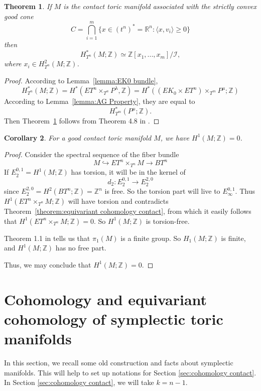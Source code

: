 \documentclass[12pt]{amsart}
\def\Z {{\mathbb{Z}}}
\def\R {{\mathbb{R}}}
\def\I {{\mathcal{I}}}
\newtheorem{theorem}{Theorem}[section]
\newtheorem{corollary}[theorem]{Corollary}
\theoremstyle{definition}
\numberwithin{equation}{section}
\begin{document}
\begin{theorem}\label{theorem:equivariant cohomology contact}
 If $M$ is the contact toric manifold associated with the strictly convex good cone \[C= \bigcap_{i=1}^{m}\{x\in
(t^{n})^{*}=\R^n: \langle x, v_{i}\rangle \geq 0\}\] then
\[H_{T^n}^{*}(M;\Z)\simeq \Z[x_{1},...,x_{m}]/\I,\]
where $x_{i}\in H^{2}_{T^n}(M;\Z)$.
\end{theorem}
\begin{proof} According to Lemma~\ref{lemma:EK0 bundle},\[H_{T^n}^{*}(M;\Z)=H^{*}(ET^n\times_{T^n} P^{\lambda},\Z)=
H^{*}((EK_{0}\times ET^n)\times_{T^m}P^{\mu};\Z)\]
 According to Lemma~\ref{lemma:AG Property}, they are equal
to \[H_{T^m}^{*}(P^{\mu};\Z).\] Then
Theorem~\ref{theorem:equivariant cohomology contact} follows from
Theorem 4.8 in \cite{DJ}.
\end{proof}

\begin{corollary}\label{cor:H^1 of M}
For a good contact toric manifold $M$, we have $H^{1}(M;\Z)=0$.
\end{corollary}
\begin{proof}
Consider the spectral sequence of the fiber bundle
\begin{equation}
M\hookrightarrow ET^n\times_{T^n}M \rightarrow BT^n
\end{equation}
If $E_{2}^{0,1}=H^{1}(M;\Z)$ has torsion, it will be in the kernel
of
\begin{equation}
d_{2}: E_{2}^{0,1}\rightarrow E_{2}^{2,0}
\end{equation}
since $E_{2}^{2,0}=H^{2}(BT^n;\Z)=\Z^n$ is free. So the torsion part
will live to $E_{\infty}^{0,1}$. Thus $H^{1}(ET^n\times_{T^n}M;\Z)$
will have torsion and contradicts Theorem~\ref{theorem:equivariant
cohomology contact}, from which it easily follows that
$H^{1}(ET^n\times_{T^n}M;\Z)=0$.  So $H^{1}(M;\Z)$ is torsion-free.

Theorem 1.1 in \cite{L:homotopy group} tells us that $\pi_{1}(M)$ is
a finite group. So $H_{1}(M;\Z)$ is finite, and $H^{1}(M;\Z)$ has no
free part.

Thus, we may conclude that $H^{1}(M;\Z)=0$.
\end{proof}

\section{\bf Cohomology and equivariant cohomology of symplectic toric
manifolds}\label{sec:symplectic orbifold} In this section, we recall
some old construction and facts about symplectic manifolds. This
will help to set up notations for Section \ref{sec:cohomology
contact}. In Section \ref{sec:cohomology contact}, we will take
$k=n-1$.
\end{document}
